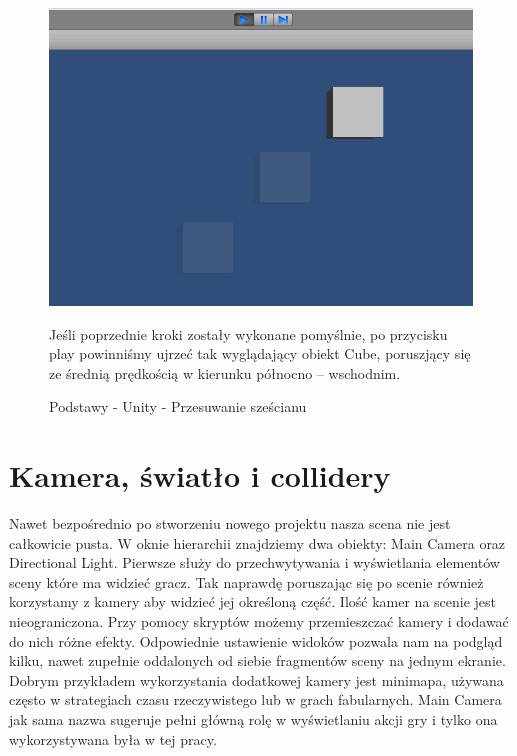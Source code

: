 \documentclass[openright]{xmgr}
\begin{document}
\begin{figure}[!htb]
    \begin{center}
    \includegraphics[scale=0.25]{Screeny/rodzial5screeny/moving_cube}
    \end{center}
    \caption{Podstawy - Unity - Przesuwanie sześcianu}
Jeśli poprzednie kroki zostały wykonane pomyślnie, po przycisku play powinniśmy ujrzeć tak wyglądający obiekt Cube, poruszjący się ze średnią prędkością w kierunku północno – wschodnim.
\end{figure}


\newpage
\section{Kamera, światło i collidery}

Nawet bezpośrednio po stworzeniu nowego projektu nasza scena nie jest całkowicie pusta. W oknie hierarchii znajdziemy dwa obiekty: Main Camera oraz Directional Light. Pierwsze służy do przechwytywania i wyświetlania elementów sceny które ma widzieć gracz. Tak naprawdę poruszając się po scenie również korzystamy z kamery aby widzieć jej określoną część. Ilość kamer na scenie jest nieograniczona. Przy pomocy skryptów możemy przemieszczać kamery i dodawać do nich różne efekty. Odpowiednie ustawienie widoków pozwala nam na podgląd kilku, nawet zupełnie oddalonych od siebie fragmentów sceny na jednym ekranie. Dobrym przykładem wykorzystania dodatkowej kamery jest minimapa, używana często w strategiach czasu rzeczywistego lub w grach fabularnych.  Main Camera jak sama nazwa sugeruje pełni główną rolę w wyświetlaniu akcji gry i tylko ona wykorzystywana była w tej pracy.
\end{document}
